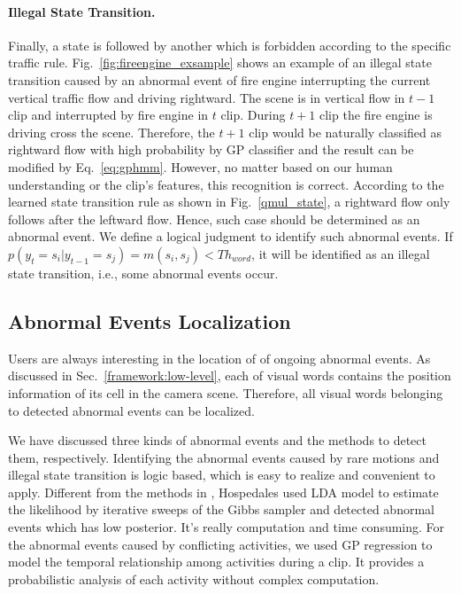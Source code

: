 \paragraph*{Illegal State Transition.} Finally, a state is followed by another which is forbidden according to the specific traffic rule. Fig.~\ref{fig:fireengine_exsample} shows an example of an illegal state transition caused by an abnormal event of fire engine interrupting the current vertical traffic flow and driving rightward. The scene is in vertical flow in $t-1$ clip and interrupted by fire engine in $t$ clip. During $t+1$ clip the fire engine is driving cross the scene. Therefore, the $t+1$ clip would be naturally classified as rightward flow with high probability by GP classifier and the result can be modified by Eq.~\eqref{eq:gphmm}. However, no matter based on our human understanding or the clip's features, this recognition is correct. According to the learned state transition rule as shown in Fig.~\ref{qmul_state}, a rightward flow only follows after the leftward flow. Hence, such case should be determined as an abnormal event. We define a logical judgment to identify such abnormal events. If $p(y_t=s_i|y_{t-1}=s_j)= m(s_i,s_j)<Th_{word}$, it will be identified as an illegal state transition, i.e., some abnormal events occur.  

\subsection*{Abnormal Events Localization}
Users are always interesting in the location of of ongoing abnormal events. As discussed in Sec.~\ref{framework:low-level}, each of visual words contains the position information of its cell in the camera scene. Therefore, all visual words belonging to detected abnormal events can be localized. 

We have discussed three kinds of abnormal events and the methods to detect them, respectively. Identifying the abnormal events caused by rare motions and illegal state transition is logic based, which is easy to realize and convenient to apply. 
Different from the methods in \cite{hospedales2011identifying, hospedales2009markov}, Hospedales used LDA model to estimate the likelihood by iterative sweeps of the Gibbs sampler and detected abnormal events which has low posterior. It's really computation and time consuming. 
For the abnormal events caused by conflicting activities, we used GP regression to model the temporal relationship among activities during a clip. It provides a probabilistic analysis of each activity without complex computation.
